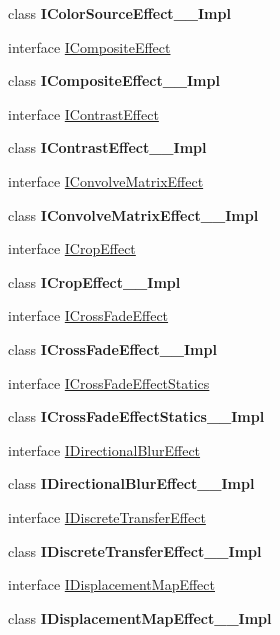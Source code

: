 \begin{DoxyCompactItemize}
class {\bfseries I\+Color\+Source\+Effect\+\_\+\+\_\+\+Impl}
\item 
interface \hyperlink{interface_microsoft_1_1_graphics_1_1_canvas_1_1_effects_1_1_i_composite_effect}{I\+Composite\+Effect}
\item 
class {\bfseries I\+Composite\+Effect\+\_\+\+\_\+\+Impl}
\item 
interface \hyperlink{interface_microsoft_1_1_graphics_1_1_canvas_1_1_effects_1_1_i_contrast_effect}{I\+Contrast\+Effect}
\item 
class {\bfseries I\+Contrast\+Effect\+\_\+\+\_\+\+Impl}
\item 
interface \hyperlink{interface_microsoft_1_1_graphics_1_1_canvas_1_1_effects_1_1_i_convolve_matrix_effect}{I\+Convolve\+Matrix\+Effect}
\item 
class {\bfseries I\+Convolve\+Matrix\+Effect\+\_\+\+\_\+\+Impl}
\item 
interface \hyperlink{interface_microsoft_1_1_graphics_1_1_canvas_1_1_effects_1_1_i_crop_effect}{I\+Crop\+Effect}
\item 
class {\bfseries I\+Crop\+Effect\+\_\+\+\_\+\+Impl}
\item 
interface \hyperlink{interface_microsoft_1_1_graphics_1_1_canvas_1_1_effects_1_1_i_cross_fade_effect}{I\+Cross\+Fade\+Effect}
\item 
class {\bfseries I\+Cross\+Fade\+Effect\+\_\+\+\_\+\+Impl}
\item 
interface \hyperlink{interface_microsoft_1_1_graphics_1_1_canvas_1_1_effects_1_1_i_cross_fade_effect_statics}{I\+Cross\+Fade\+Effect\+Statics}
\item 
class {\bfseries I\+Cross\+Fade\+Effect\+Statics\+\_\+\+\_\+\+Impl}
\item 
interface \hyperlink{interface_microsoft_1_1_graphics_1_1_canvas_1_1_effects_1_1_i_directional_blur_effect}{I\+Directional\+Blur\+Effect}
\item 
class {\bfseries I\+Directional\+Blur\+Effect\+\_\+\+\_\+\+Impl}
\item 
interface \hyperlink{interface_microsoft_1_1_graphics_1_1_canvas_1_1_effects_1_1_i_discrete_transfer_effect}{I\+Discrete\+Transfer\+Effect}
\item 
class {\bfseries I\+Discrete\+Transfer\+Effect\+\_\+\+\_\+\+Impl}
\item 
interface \hyperlink{interface_microsoft_1_1_graphics_1_1_canvas_1_1_effects_1_1_i_displacement_map_effect}{I\+Displacement\+Map\+Effect}
\item 
class {\bfseries I\+Displacement\+Map\+Effect\+\_\+\+\_\+\+Impl}

\end{DoxyCompactItemize}
